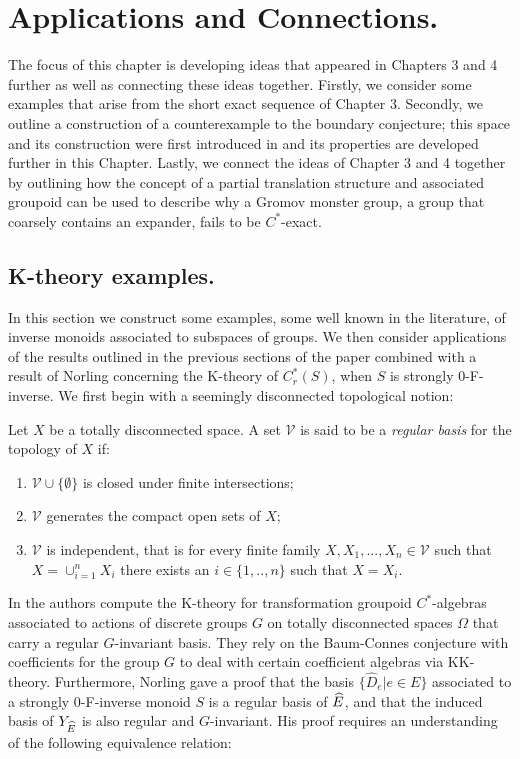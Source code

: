 \chapter{Applications and Connections.}
The focus of this chapter is developing ideas that appeared in Chapters 3 and 4 further as well as connecting these ideas together. Firstly, we consider some examples that arise from the short exact sequence of Chapter 3. Secondly, we outline a construction of a counterexample to the boundary conjecture; this space and its construction were first introduced in \cite{MR2363697} and its properties are developed further in this Chapter. Lastly, we connect the ideas of Chapter 3 and 4 together by outlining how the concept of a partial translation structure and associated groupoid can be used to describe why a Gromov monster group, a group that coarsely contains an expander, fails to be $C^{*}$-exact. 

\section{K-theory examples.}\label{sect:K-theory}

In this section we construct some examples, some well known in the literature, of inverse monoids associated to subspaces of groups. We then consider applications of the results outlined in the previous sections of the paper combined with a result of Norling \cite{Nor-2012} concerning the K-theory of $C^{*}_{r}(S)$, when $S$ is strongly 0-F-inverse. We first begin with a seemingly disconnected topological notion:

\begin{definition}
Let $X$ be a totally disconnected space. A set $\mathcal{V}$ is said to be a \textit{regular basis} for the topology of $X$ if:
\begin{enumerate}
\item $\mathcal{V}\cup \lbrace \emptyset \rbrace$ is closed under finite intersections; 
\item $\mathcal{V}$ generates the compact open sets of $X$;
\item $\mathcal{V}$ is independent, that is for every finite family $X,X_{1},...,X_{n} \in \mathcal{V}$ such that $X = \cup_{i=1}^{n} X_{i}$ there exists an $i \in \lbrace 1,..,n \rbrace$ such that $X=X_{i}$.
\end{enumerate}
\end{definition}

In \cite{CEL-2} the authors compute the K-theory for transformation groupoid $C^{*}$-algebras associated to actions of discrete groups $G$ on totally disconnected spaces $\Omega$ that carry a regular $G$-invariant basis. They rely on the Baum-Connes conjecture with coefficients for the group $G$ to deal with certain coefficient algebras via KK-theory. Furthermore, Norling \cite{Nor-2012} gave a proof that the basis $\lbrace \widehat{D}_{e} | e \in E \rbrace$ associated to a strongly $0$-F-inverse monoid $S$ is a regular basis of $\widehat{E}$, and that the induced basis of $Y_{\widehat{E}}$ is also regular and $G$-invariant. His proof requires an understanding of the following equivalence relation:

